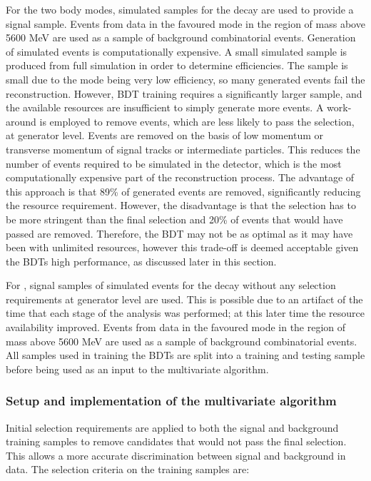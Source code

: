 For the two body modes, simulated samples for the decay \kpi are used to provide a signal sample. Events from data in the favoured \kpi mode in the region of \Bm mass above 5600 MeV are used as a sample of background combinatorial events. Generation of simulated events is computationally expensive. A small simulated sample is produced from full \lhcb simulation in order to determine efficiencies. The sample is small due to the mode being very low efficiency, so many generated events fail the reconstruction. However, BDT training requires a significantly larger sample, and the available resources are insufficient to simply generate more events. A work-around is employed to remove events, which are less likely to pass the selection, at generator level. Events are removed on the basis of low momentum or transverse momentum of signal tracks or intermediate particles. This reduces the number of events required to be simulated in the \lhcb detector, which is the most computationally expensive part of the reconstruction process. The advantage of this approach is that 89\% of generated events are removed, significantly reducing the resource requirement. However, the disadvantage is that the selection has to be more stringent than the final selection and 20\% of events that would have passed are removed. Therefore, the BDT may not be as optimal as it may have been with unlimited resources, however this trade-off is deemed acceptable given the BDTs high performance, as discussed later in this section.

For \kpipipi, signal samples of simulated events for the decay without any selection requirements at generator level are used. This is possible due to an artifact of the time that each stage of the analysis was performed; at this later time the resource availability improved. Events from data in the favoured \kpipipi mode in the region of \Bm mass above 5600 MeV are used as a sample of background combinatorial events. All samples used in training the BDTs are split into a training and testing sample before being used as an input to the multivariate algorithm.

\subsubsection{Setup and implementation of the multivariate algorithm}

Initial selection requirements are applied to both the signal and background training samples to remove candidates that would not pass the final selection. This allows a more accurate discrimination between signal and background in data. The selection criteria on the training samples are:

